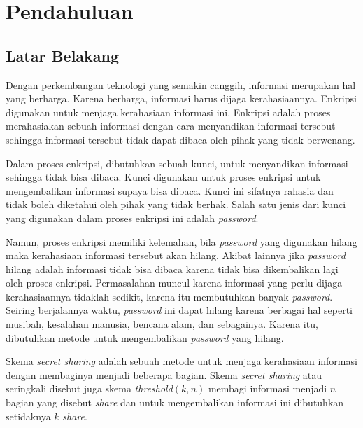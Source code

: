 \chapter{Pendahuluan}
\label{chap:Pendahuluan}

\section{\textbf{Latar Belakang}}
\label{sec:latar belakang}

Dengan perkembangan teknologi yang semakin canggih, informasi merupakan hal yang berharga. Karena berharga, informasi harus dijaga kerahasiaannya. Enkripsi digunakan untuk menjaga kerahasiaan informasi ini. Enkripsi adalah proses merahasiakan sebuah informasi dengan cara menyandikan informasi tersebut sehingga informasi tersebut tidak dapat dibaca oleh pihak yang tidak berwenang.

Dalam proses enkripsi, dibutuhkan sebuah kunci, untuk menyandikan informasi sehingga tidak bisa dibaca. Kunci digunakan untuk proses enkripsi untuk mengembalikan informasi supaya bisa dibaca. Kunci ini sifatnya rahasia dan tidak boleh diketahui oleh pihak yang tidak berhak. Salah satu jenis dari kunci yang digunakan dalam proses enkripsi ini adalah \textit{password}.

Namun, proses enkripsi memiliki kelemahan, bila \textit{password} yang digunakan hilang maka kerahasiaan informasi tersebut akan hilang. Akibat lainnya jika \textit{password} hilang adalah informasi tidak bisa dibaca karena tidak bisa dikembalikan lagi oleh proses enkripsi. Permasalahan muncul karena informasi yang perlu dijaga kerahasiaannya tidaklah sedikit, karena itu membutuhkan banyak \textit{password}. Seiring berjalannya waktu, \textit{password} ini dapat hilang karena berbagai hal seperti musibah, kesalahan manusia, bencana alam, dan sebagainya. Karena itu, dibutuhkan metode untuk mengembalikan \textit{password} yang hilang.

Skema \textit{secret sharing} adalah sebuah metode untuk menjaga kerahasiaan informasi dengan membaginya menjadi beberapa bagian. Skema \textit{secret sharing} atau seringkali disebut juga skema \textit{threshold}\begin{math}(k, n)\end{math} membagi informasi menjadi \begin{math}n\end{math} bagian yang disebut \textit{share} dan untuk mengembalikan informasi ini dibutuhkan setidaknya \begin{math}k\end{math} \textit{share}.

